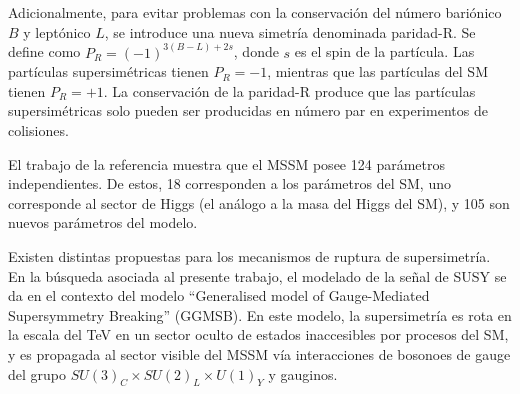 
 





Adicionalmente, para evitar problemas con la conservación del número bariónico $B$ y leptónico $L$, se introduce una nueva simetría denominada paridad-R. Se define como $P_{R}=(-1)^{3(B-L)+2s}$, donde $s$ es el spin de la partícula. Las partículas supersimétricas tienen $P_{R}=-1$, mientras que las partículas del SM tienen $P_{R}=+1$. La conservación de la paridad-R produce que las partículas supersimétricas solo pueden ser producidas en número par en experimentos de colisiones.

El trabajo de la referencia \cite{Dimopoulos:1995ju} muestra que el MSSM posee 124 parámetros independientes. De estos, 18 corresponden a los parámetros del SM, uno corresponde al sector de Higgs (el análogo a la masa del Higgs del SM), y 105 son nuevos parámetros del modelo. 

Existen distintas propuestas para los mecanismos de ruptura de supersimetría. En la búsqueda asociada al presente trabajo, el modelado de la señal de SUSY se da en el contexto del modelo “Generalised model of Gauge-Mediated Supersymmetry Breaking” (GGMSB). En este modelo, la supersimetría es rota en la escala del TeV en un sector oculto de estados inaccesibles por procesos del SM, y es propagada al sector visible del MSSM vía interacciones de bosonoes de gauge del grupo $SU(3)_{C} \times SU(2)_{L} \times U(1)_{Y}$ y gauginos.

